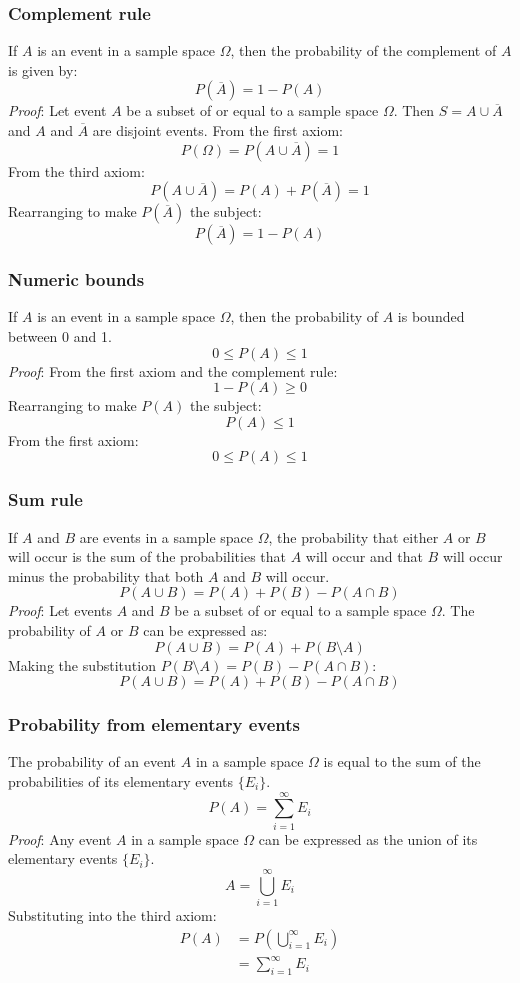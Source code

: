 \documentclass{article}
\begin{document}
\subsubsection{Complement rule}

If $A$ is an event in a sample space $\Omega$, then the probability of the complement of $A$ is given by:
\[P(\overline{A})=1-P(A)\]
\textit{Proof}: Let event $A$ be a subset of or equal to a sample space $\Omega$. Then $S=A \cup \overline{A}$ and $A$ and $\overline{A}$ are disjoint events. From the first axiom:
\[P(\Omega) = P(A \cup \overline{A}) = 1\]
From the third axiom:
\[P(A \cup \overline{A}) = P(A)+P(\overline{A}) = 1\]
Rearranging to make $P(\overline{A})$ the subject:
\[P(\overline{A}) = 1-P(A)\]

\subsubsection{Numeric bounds}

If $A$ is an event in a sample space $\Omega$, then the probability of $A$ is bounded between 0 and 1.
\[0\leq P(A) \leq 1\]
\textit{Proof}: From the first axiom and the complement rule:
\[1-P(A) \geq 0\]
Rearranging to make $P(A)$ the subject:
\[P(A) \leq 1\]
From the first axiom:
\[0 \leq P(A) \leq 1\]

\subsubsection{Sum rule}

If $A$ and $B$ are events in a sample space $\Omega$, the probability that either $A$ or $B$ will occur is the sum of the probabilities that $A$ will occur and that $B$ will occur minus the probability that both $A$ and $B$ will occur.
\[P(A \cup B)=P(A)+P(B)-P(A \cap B)\]
\textit{Proof}: Let events $A$ and $B$ be a subset of or equal to a sample space $\Omega$. The probability of $A$ or $B$ can be expressed as:
\[P(A \cup B) = P(A) + P(B \setminus A)\]
Making the substitution $P(B \setminus A) = P(B) - P(A \cap B)$:
\[P(A \cup B) = P(A) + P(B) - P(A \cap B)\]

\subsubsection{Probability from elementary events}

The probability of an event $A$ in a sample space $\Omega$ is equal to the sum of the probabilities of its elementary events $\{E_i\}$.
\[P(A)=\sum_{i=1}^\infty E_i\]
\textit{Proof}: Any event $A$ in a sample space $\Omega$ can be expressed as the union of its elementary events $\{E_i\}$.
\[A=\bigcup_{i=1}^\infty E_i\]
Substituting into the third axiom:
\begin{equation*}
\begin{split}
P(A) & = P(\bigcup_{i=1}^\infty E_i) \\
 & = \sum_{i=1}^\infty E_i
\end{split}
\end{equation*}
\end{document}
